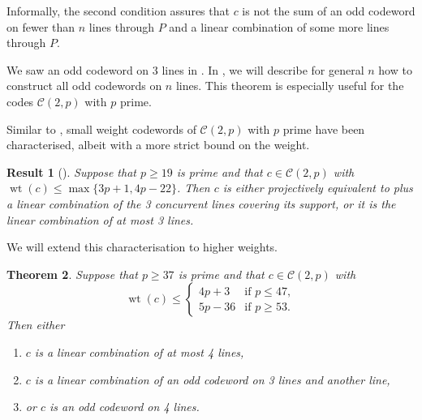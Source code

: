 \documentclass[12pt, a4paper]{article}
\newtheorem{thm}{Theorem}[section]
\newtheorem{res}[thm]{Result}
\theoremstyle{definition}
\newcommand{\mc}{\mathcal C}
\newcommand{\sam}[1]{\textcolor{purple}{#1}}
\DeclareMathOperator{\wt}{wt}
\begin{document}
Informally, the second condition assures that $c$ is not the sum of an odd codeword on fewer than $n$ lines through $P$ and a linear combination of some more lines through $P$.

We saw an odd codeword on 3 lines in .
In , we will describe for general $n$ how to construct all odd codewords on $n$ lines.
This theorem is especially useful for the codes $\mc(2,p)$ with $p$ prime.


\bigskip

Similar to , small weight codewords of $\mc(2,p)$ with $p$ prime have been characterised, albeit with a more strict bound on the weight.


\begin{res}[{\cite[Theorem 4.8, Corollary 4.10]{Szonyi:Weiner:14}}]
 \label{Res:SzWPrime}
 Suppose that $p \geq 19$ is prime and that $c \in \mc(2,p)$ with $\wt(c) \leq \max\{3p+1, 4p-22\}$.
 Then $c$ is either projectively equivalent to  plus a linear combination of the 3 concurrent lines covering its support, or it is the linear combination of at most 3 lines.
\end{res}

We will extend this characterisation to higher weights.

\begin{thm}
 \label{Thm:SmallWeight}
Suppose that $p \geq 37$ is prime and that $c \in \mc(2,p)$ with
\[
 \wt(c) \leq \begin{cases}
  4p+3 & \text{if } p \leq 47, \\
  5p-36 & \text{if } p \geq 53.
 \end{cases}
\]
 Then either
 \begin{enumerate}
  \item $c$ is a linear combination of at most 4 lines,
  \item $c$ is a linear combination of an odd codeword on 3 lines and another line,
  \item or $c$ is an odd codeword on 4 lines.
 \end{enumerate}
\end{thm}
\end{document}

